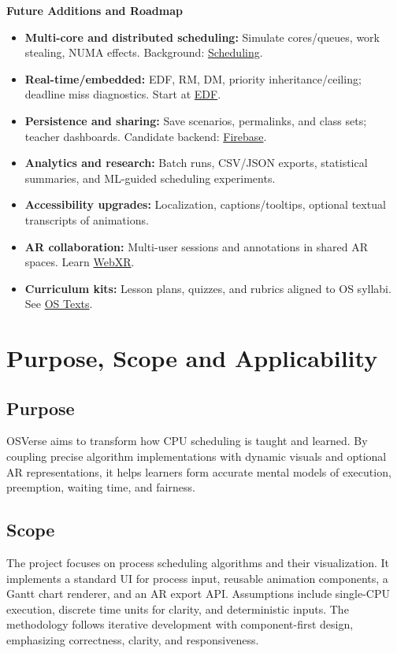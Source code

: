 \documentclass[12pt,a4paper,oneside]{report}
\begin{document}
\noindent\textbf{Future Additions and Roadmap}
\begin{itemize}
  \item \textbf{Multi-core and distributed scheduling:} Simulate cores/queues, work stealing, NUMA effects. Background: \href{https://en.wikipedia.org/wiki/Scheduling_(computing)}{Scheduling}.
  \item \textbf{Real-time/embedded:} EDF, RM, DM, priority inheritance/ceiling; deadline miss diagnostics. Start at \href{https://osverse.shreyjain.me/edf}{EDF}.
  \item \textbf{Persistence and sharing:} Save scenarios, permalinks, and class sets; teacher dashboards. Candidate backend: \href{https://firebase.google.com/}{Firebase}.
  \item \textbf{Analytics and research:} Batch runs, CSV/JSON exports, statistical summaries, and ML-guided scheduling experiments.
  \item \textbf{Accessibility upgrades:} Localization, captions/tooltips, optional textual transcripts of animations.
  \item \textbf{AR collaboration:} Multi-user sessions and annotations in shared AR spaces. Learn \href{https://www.w3.org/TR/webxr/}{WebXR}.
  \item \textbf{Curriculum kits:} Lesson plans, quizzes, and rubrics aligned to OS syllabi. See \href{https://www.os-book.com}{OS Texts}.
\end{itemize}

\section{Purpose, Scope and Applicability}
\subsection{Purpose}
OSVerse aims to transform how CPU scheduling is taught and learned. By coupling precise algorithm implementations with dynamic visuals and optional AR representations, it helps learners form accurate mental models of execution, preemption, waiting time, and fairness.

\subsection{Scope}
The project focuses on process scheduling algorithms and their visualization. It implements a standard UI for process input, reusable animation components, a Gantt chart renderer, and an AR export API. Assumptions include single-CPU execution, discrete time units for clarity, and deterministic inputs. The methodology follows iterative development with component-first design, emphasizing correctness, clarity, and responsiveness.
\end{document}
